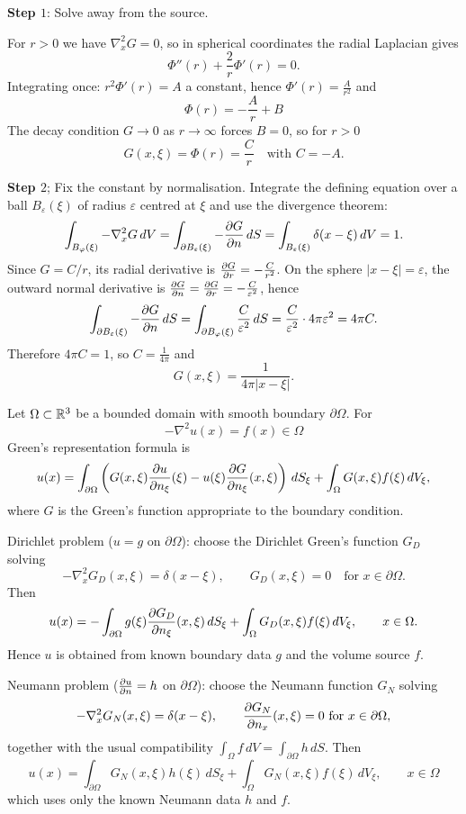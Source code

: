 \documentclass[10pt, a4paper]{article}
\begin{document}
\textbf{Step $1$}:
Solve away from the source.

For $r > 0$ we have $\nabla_{x}^{2}G = 0$,
so in spherical coordinates the radial Laplacian gives
\[
\Phi''(r) + \frac{2}{r}\Phi'(r) = 0.
\]
Integrating once:
$r ^ 2\Phi'(r) = A$ a constant,
hence $\Phi'(r) = \frac{A}{r ^ 2}$ and
\[
\Phi(r) = -\frac{A}{r} + B
\]
The decay condition $G \to 0$ as $r \to \infty$ forces $B = 0$,
so for $r > 0$
\[
G(x, \xi) = \Phi(r) = \frac{C}{r}\quad\text{with }C = -A.
\]

\textbf{Step $2$};
Fix the constant by normalisation.
Integrate the defining equation over a ball $B_{\varepsilon}(\xi)$ of radius $\varepsilon$ centred at $\xi$ and use the divergence theorem:
\[
\int_{B_{\varphi}(\xi)}-\nabla_{x}^{2}G\,dV = \int_{\partial B_{\varepsilon}(\xi)}-\pd[G]{n}\,dS = \int_{B_{\varepsilon}(\xi)}\delta(x - \xi)\,dV = 1.
\]
Since $G = C / r$,
its radial derivative is $\pd[G]{r} = -\frac{C}{r ^ 2}$.
On the sphere $|x - \xi| = \varepsilon$,
the outward normal derivative is $\pd[G]{n} = \pd[G]{r} = -\frac{C}{\varepsilon ^ 2}$,
hence
\[
\int_{\partial B_{\varepsilon}(\xi)}-\pd[G]{n}\,dS = \int_{\partial B_{\varphi}(\xi)}\frac{C}{\varepsilon ^ 2}\,dS = \frac{C}{\varepsilon ^ 2}\cdot 4\pi\varepsilon ^ 2 = 4\pi C.
\]
Therefore $4\pi C = 1$,
so $C = \frac{1}{4\pi}$ and
\[
G(x, \xi) = \frac{1}{4\pi|x - \xi|}.
\]

Let $\Omega \subset \R ^ 3$ be a bounded domain with smooth boundary $\partial\Omega$.
For
\[
-\nabla ^ 2u(x) = f(x) \in \Omega
\]
Green's representation formula is
\[
u(x) = \int_{\partial\Omega}\left(G(x, \xi)\pd[u]{n_{\xi}}(\xi) - u(\xi)\pd[G]{n_{\xi}}(x, \xi)\right)\,dS_{\xi} + \int_{\Omega}G(x, \xi)f(\xi)\,dV_{\xi},
\]
where $G$ is the Green's function appropriate to the boundary condition.

Dirichlet problem
($u = g$ on $\partial\Omega$):
choose the Dirichlet Green's function $G_{D}$ solving
\[
-\nabla_{x}^{2}G_{D}(x, \xi) = \delta(x - \xi),\qquad G_{D}(x, \xi) = 0\quad\text{for $x \in \partial\Omega$}.
\]
Then
\[
u(x) = -\int_{\partial\Omega}g(\xi)\pd[G_{D}]{n_{\xi}}(x, \xi)\,dS_{\xi} + \int_{\Omega}G_{D}(x, \xi)f(\xi)\,dV_{\xi},\qquad x \in \Omega.
\]
Hence $u$ is obtained from known boundary data $g$ and the volume source $f$.

Neumann problem
($\pd[u]{n} = h$ on $\partial\Omega$):
choose the Neumann function $G_{N}$ solving
\[
-\nabla_{x}^{2}G_{N}(x, \xi) = \delta(x - \xi),\qquad \pd[G_{N}]{n_x}(x, \xi) = 0\text{ for } x \in \partial\Omega,
\]
together with the usual compatibility $\int_{\Omega}f\,dV = \int_{\partial\Omega}h\,dS$.
Then
\[
u(x) = \int_{\partial\Omega}G_{N}(x, \xi)h(\xi)\,dS_{\xi} + \int_{\Omega}G_{N}(x, \xi)f(\xi)\,dV_{\xi},\qquad x \in \Omega
\]
which uses only the known Neumann data $h$ and $f$.
\end{document}
